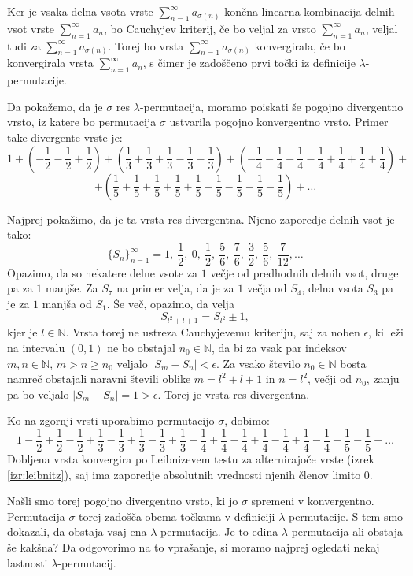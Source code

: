 \documentclass[12pt,a4paper,reqno]{amsart}
\theoremstyle{definition} %
\theoremstyle{plain} %
\newcommand{\N}{\mathbb N}
\begin{document}
Ker je vsaka delna vsota vrste $\sum^{\infty}_{n=1}a_{\sigma(n)}$ končna linearna kombinacija delnih vsot vrste $\sum^{\infty}_{n=1}a_{n}$, bo Cauchyjev kriterij, če bo veljal za vrsto $\sum^{\infty}_{n=1}a_{n}$, veljal tudi za $\sum^{\infty}_{n=1}a_{\sigma(n)}$. Torej bo vrsta $\sum^{\infty}_{n=1}a_{\sigma(n)}$ konvergirala, če bo konvergirala vrsta $\sum^{\infty}_{n=1}a_{n}$, s čimer je zadoščeno prvi točki iz definicije $\lambda$-permutacije.

Da pokažemo, da je $\sigma$ res $\lambda$-permutacija, moramo poiskati še pogojno divergentno vrsto, iz katere bo permutacija $\sigma$ ustvarila pogojno konvergentno vrsto. Primer take divergente vrste je:
$$1+\left (-\frac{1}{2}-\frac{1}{2}+\frac{1}{2}\right )+\left (\frac{1}{3}+\frac{1}{3}+\frac{1}{3}-\frac{1}{3}-\frac{1}{3} \right )+\left (-\frac{1}{4}-\frac{1}{4}-\frac{1}{4}-\frac{1}{4}+\frac{1}{4}+\frac{1}{4}+\frac{1}{4}\right )+$$ $$+\left (\frac{1}{5}+\frac{1}{5}+\frac{1}{5}+\frac{1}{5}+\frac{1}{5}-\frac{1}{5}-\frac{1}{5}-\frac{1}{5}-\frac{1}{5} \right )+\dots $$

Najprej pokažimo, da je ta vrsta res divergentna. Njeno zaporedje delnih vsot je tako: $$\{S_n\}_{n=1}^{\infty}=1, \ \frac{1}{2}, \ 0, \ \frac{1}{2}, \ \frac{5}{6}, \ \frac{7}{6}, \ \frac{3}{2}, \ \frac{5}{6}, \ \frac{7}{12}, \ldots $$
Opazimo, da so nekatere delne vsote za $1$ večje od predhodnih delnih vsot, druge pa za $1$ manjše. Za $S_7$ na primer velja, da je za $1$ večja od $S_4$, delna vsota $S_3$ pa je za $1$ manjša od $S_1$. Še več, opazimo, da velja $$S_{l^2+l+1}=S_{l^2}\pm 1,$$
kjer je $l\in\N$. Vrsta torej ne ustreza Cauchyjevemu kriteriju, saj za noben $\epsilon$, ki leži na intervalu $(0,1)$ ne bo obstajal $n_0 \in \N$, da bi za vsak par indeksov $m,n\in \N \textrm{, }m>n\geq n_0$ veljalo $|S_m-S_n|<\epsilon.$ Za vsako število $n_0 \in \N$ bosta namreč obstajali naravni števili oblike $m=l^2+l+1$ in $n=l^2$, večji od $n_0$, zanju pa bo veljalo $|S_m-S_n|=1>\epsilon$. Torej je vrsta res divergentna.

Ko na zgornji vrsti uporabimo permutacijo $\sigma$, dobimo:
$$1-\frac{1}{2}+\frac{1}{2}-\frac{1}{2}+\frac{1}{3}-\frac{1}{3}+\frac{1}{3}-\frac{1}{3}+\frac{1}{3}-\frac{1}{4}+\frac{1}{4}-\frac{1}{4}+\frac{1}{4}-\frac{1}{4}+\frac{1}{4}-\frac{1}{4}+\frac{1}{5}-\frac{1}{5} \pm \dots$$
Dobljena vrsta konvergira po Leibnizevem testu za alternirajoče vrste (izrek \ref{izr:leibnitz}), saj ima zaporedje absolutnih vrednosti njenih členov limito 0.

Našli smo torej pogojno divergentno vrsto, ki jo $\sigma$ spremeni v konvergentno. Permutacija $\sigma$ torej zadošča obema točkama v definiciji $\lambda$-permutacije. S tem smo dokazali, da obstaja vsaj ena $\lambda$-permutacija. Je to edina $\lambda$-permutacija ali obstaja še kakšna? Da odgovorimo na to vprašanje, si moramo najprej ogledati nekaj lastnosti $\lambda$-permutacij.
\end{document}
